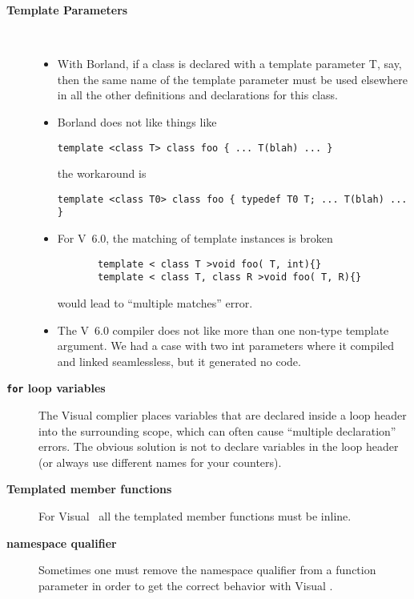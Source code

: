 \begin{description}
\item[\textbf{Template Parameters}]
\ 
\begin{itemize}
\item
With Borland, if a class is declared with a template parameter T, say, then
the same name of the template parameter must be used elsewhere in all
the other definitions and declarations for this class.

\item
Borland does not like things like
\begin{center}
\verb|template <class T> class foo { ... T(blah) ... }|
\end{center}

the workaround is
\begin{center}
\verb|template <class T0> class foo { typedef T0 T; ... T(blah) ... }|
\end{center}

\item
For V\CC\ 6.0, the matching of template instances is broken 
\begin{verbatim}
       template < class T >void foo( T, int){}
       template < class T, class R >void foo( T, R){}
\end{verbatim}
would lead to ``multiple matches'' error. 

\item
The V\CC\ 6.0 compiler does not like more than one non-type template
argument.  We had a case with two int parameters where it compiled and
linked seamlessless, but it generated no code.

\end{itemize}


\item[\textbf{{\tt for} loop variables}]

The Visual \CC complier places variables that are declared inside
a \ccc{for} loop header into the surrounding scope, which can often
cause ``multiple declaration'' errors.  The obvious solution is not
to declare variables in the \ccc{for} loop header (or always use
different names for your counters).


\item[\textbf{Templated member functions}]

For Visual \CC\, all the templated member functions must be inline. 

\item[\textbf{namespace qualifier}]

Sometimes one must remove the namespace qualifier from a function
parameter in order to get the correct behavior with Visual \CC.


\end{description}
